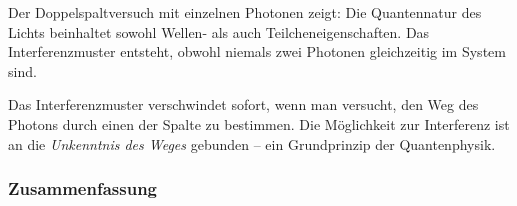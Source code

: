 \vspace{1em}
\begin{tcolorbox}[hypobox, title=Schlüsselidee]
	\label{box:schlüsselidee}
	\small
	Der Doppelspaltversuch mit einzelnen Photonen zeigt: Die Quantennatur des Lichts beinhaltet sowohl Wellen- als auch Teilcheneigenschaften. Das Interferenzmuster entsteht, obwohl niemals zwei Photonen gleichzeitig im System sind.
\end{tcolorbox}
\vspace{1em}
\begin{tcolorbox}[didaktikbox, title=Wellen-als auch Teilcheneigenschaften]
	\label{box:wellen}
	\small
	Das Interferenzmuster verschwindet sofort, wenn man versucht, den Weg des Photons durch einen der Spalte zu bestimmen. Die Möglichkeit zur Interferenz ist an die \emph{Unkenntnis des Weges} gebunden – ein Grundprinzip der Quantenphysik.
\end{tcolorbox}

\subsubsection*{Zusammenfassung}

